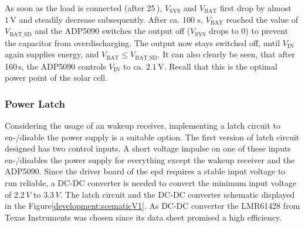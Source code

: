 As soon as the load is connected (after 25\,), $V_{\text{SYS}}$ and $V_{\text{BAT}}$ first drop by almost $1\,\text{V}$ and steadily decrease subsequently.
After ca. 100 s, $V_{\text{BAT}}$ reached the value of $V_{\text{BAT\_SD}}$ and the ADP5090 switches the output off ($V_{\text{SYS}}$ drops to 0) to prevent the capacitor from overdischarging.
The output now stays switched off, until $V_{\text{IN}}$ again supplies energy, and $V_{\text{BAT}} \le V_{\text{BAT\_SD}}$.
It can also clearly be seen, that after 160\,s, the ADP5090 controls $V_{\text{IN}}$ to ca. $2.1\,\text{V}$. Recall that this is the optimal power point of the solar cell.

\subsubsection{Power Latch}
Considering the usage of an wakeup receiver, implementing a latch circuit to en-/disable the power supply is a suitable option. The first version of latch circuit designed has two control inputs. A short voltage impulse on one of these inputs en-/disables the power supply for everything except the wakeup receiver and the ADP5090. Since the driver board of the \acs{epd} requires a stable input voltage to run reliable, a DC-DC converter is needed to convert the minimum input voltage of $2.2\,V$ to $3.3\,V$. The latch circuit and the DC-DC converter schematic displayed in the Figure\ref{development:scematicV1}. As DC-DC converter the LMR61428 from Texas Instruments was chosen since its data sheet promised a high efficiency.

